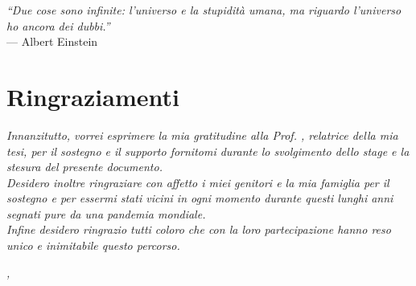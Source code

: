 \cleardoublepage
{}
{}

\begin{flushright}{
    \slshape
    ``Due cose sono infinite: l’universo e la stupidità umana, ma riguardo l’universo ho ancora dei dubbi.''} \\
    \medskip
    --- Albert Einstein
\end{flushright}


\bigskip

\begingroup
\let\clearpage\relax
\let\cleardoublepage\relax
\let\cleardoublepage\relax

\chapter*{Ringraziamenti}

\noindent \textit{Innanzitutto, vorrei esprimere la mia gratitudine alla Prof. \myProf, relatrice della mia tesi, per il sostegno e il supporto fornitomi durante lo svolgimento dello stage e la stesura del presente documento.}\\

\noindent \textit{Desidero inoltre ringraziare con affetto i miei genitori e la mia famiglia per il sostegno e per essermi stati vicini in ogni momento durante questi lunghi anni segnati pure da una pandemia mondiale.}\\

\noindent \textit{Infine desidero ringrazio tutti coloro che con la loro partecipazione hanno reso unico e inimitabile questo percorso.}\\
\bigskip

\noindent\textit{\myLocation, \myTime}
\hfill \myName

\endgroup
